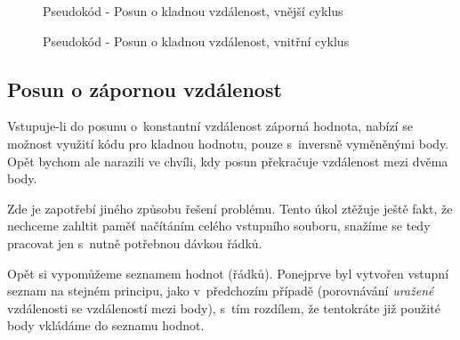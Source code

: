     \begin{figure}[h]
    \centering
    \begin{algorithmic}[1]
    \ENDIF
    \ENDWHILE
    \end{algorithmic}
    \caption{Pseudokód - Posun o kladnou vzdálenost, vnější cyklus}
    \label{fig:pseudokladnavzd-vnejsi}
    \end{figure}
    
    \begin{figure}[h]
    \centering
    \begin{algorithmic}[1]
    \ENDIF
    \ENDWHILE
    \end{algorithmic}
    \caption{Pseudokód - Posun o kladnou vzdálenost, vnitřní cyklus}
    \label{fig:pseudokladnavzd-vnitrni}
    \end{figure}

\subsection{Posun o zápornou vzdálenost}
\label{zapornavzdalenost}

Vstupuje-li do posunu o~konstantní vzdálenost záporná hodnota, nabízí se možnost
využití kódu pro kladnou hodnotu, pouze s~inversně vyměněnými body. Opět bychom ale narazili
ve chvíli, kdy posun překračuje vzdálenost mezi dvěma body. 

Zde je zapotřebí jiného způsobu řešení problému. Tento úkol ztěžuje ještě fakt, že nechceme
zahltit paměť načítáním celého vstupního souboru, snažíme se tedy pracovat jen s~nutně
potřebnou dávkou řádků. 

Opět si vypomůžeme seznamem hodnot (řádků). Ponejprve byl vytvořen vstup\-ní seznam
na stejném principu, jako v~předchozím případě (porovnávání \textit{uražené} vzdálenosti se
vzdáleností mezi body), s~tím rozdílem, že tentokráte již použité body vkládáme do seznamu hodnot.

